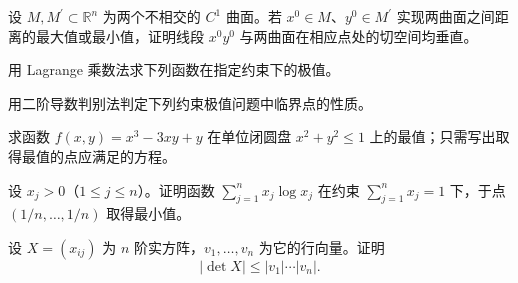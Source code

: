 \noindent\begin{minipage}{\textwidth}
设 $M,M^{\prime}\subset\mathbb R^n$ 为两个不相交的 $C^1$ 曲面。若 $x^0\in M$、$y^0\in M^{\prime}$ 实现两曲面之间距离的最大值或最小值，证明线段 $x^0y^0$ 与两曲面在相应点处的切空间均垂直。
\end{minipage}\par\vfill
\newpage
\noindent\begin{minipage}{\textwidth}
用 Lagrange 乘数法求下列函数在指定约束下的极值。
\end{minipage}\par\vfill
\noindent\begin{minipage}{\textwidth}
用二阶导数判别法判定下列约束极值问题中临界点的性质。
\end{minipage}\par\vfill
\noindent\begin{minipage}{\textwidth}
求函数 $f(x,y)=x^3-3xy+y$ 在单位闭圆盘 $x^2+y^2\le1$ 上的最值；只需写出取得最值的点应满足的方程。
\end{minipage}\par\vfill
\noindent\begin{minipage}{\textwidth}
设 $x_j>0$（$1\le j\le n$）。证明函数 $\sum_{j=1}^n x_j\log x_j$ 在约束 $\sum_{j=1}^n x_j=1$ 下，于点 $(1/n,\ldots,1/n)$ 取得最小值。
\end{minipage}\par\vfill
\newpage
\noindent\begin{minipage}{\textwidth}
设 $X=(x_{ij})$ 为 $n$ 阶实方阵，$v_1,\ldots,v_n$ 为它的行向量。证明\[|\det X|\le |v_1|\cdots|v_n|.\]
\end{minipage}\par\vfill
